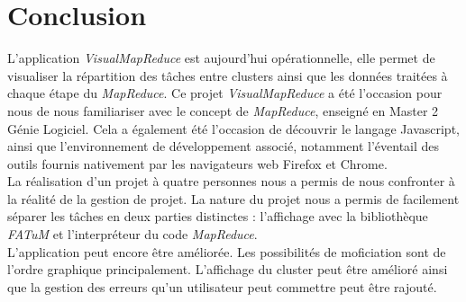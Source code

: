 \chapter*{Conclusion}

L'application {\it VisualMapReduce} est aujourd'hui opérationnelle, elle permet de visualiser la répartition des tâches entre clusters ainsi que les données traitées à chaque étape du {\it MapReduce}. Ce projet \textit{VisualMapReduce} a été l'occasion pour nous de nous familiariser avec le concept de {\it MapReduce}, enseigné en Master 2 Génie Logiciel. Cela a également été l'occasion de découvrir le langage Javascript, ainsi que l'environnement de développement associé, notamment l'éventail des outils fournis nativement par les navigateurs web Firefox et Chrome.
\\

La réalisation d'un projet à quatre personnes nous a permis de nous confronter à la réalité de la gestion de projet. La nature du projet nous a permis de facilement séparer les tâches en deux parties distinctes : l'affichage avec la bibliothèque {\it FATuM} et l'interpréteur du code {\it MapReduce}.
\\
L'application peut encore être améliorée. Les possibilités de moficiation sont de l'ordre graphique principalement. L'affichage du cluster peut être amélioré ainsi que la gestion des erreurs qu'un utilisateur peut commettre peut être rajouté.